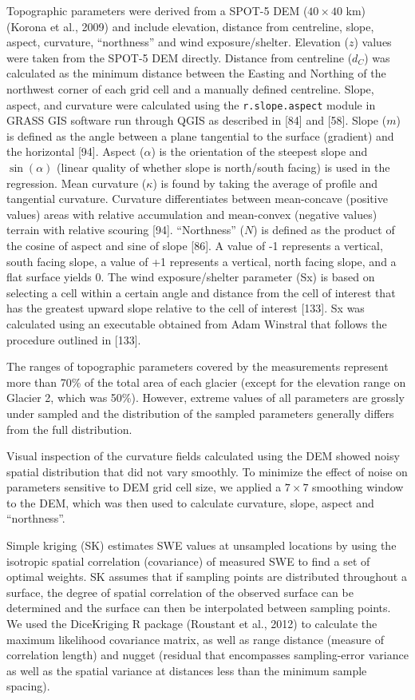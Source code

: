 \documentclass[twocolumn,letterpaper]{igs}
\begin{document}
Topographic parameters were derived from a SPOT-5 DEM ($40\times40$ km) (Korona et al., 2009) and include elevation, distance from centreline, slope, aspect, curvature, ``northness'' and wind exposure/shelter. Elevation ($z$) values were taken from the SPOT-5 DEM directly. Distance from centreline ($d_C$) was calculated as the minimum distance between the Easting and Northing of the northwest corner of each grid cell and a manually defined centreline. Slope, aspect, and curvature were calculated using the \texttt{r.slope.aspect} module in GRASS GIS software run through QGIS as described in [84] and [58]. Slope ($m$) is defined as the angle between a plane tangential to the surface (gradient) and the horizontal [94]. Aspect ($\alpha$) is the orientation of the steepest slope and $\sin(\alpha)$ (linear quality of whether slope is north/south facing) is used in the regression. Mean curvature ($\kappa$) is found by taking the average of profile and tangential curvature. Curvature differentiates between mean-concave (positive values) areas with relative accumulation and mean-convex (negative values) terrain with relative scouring [94].   ``Northness'' ($N$) is defined as the product of the cosine of aspect and sine of slope [86]. A value of -1 represents a vertical, south facing slope, a value of +1 represents a vertical, north facing slope, and a flat surface yields 0. The wind exposure/shelter parameter (Sx) is based on selecting a cell within a certain angle and distance from the cell of interest that has the greatest upward slope relative to the cell of interest [133]. Sx was calculated using an executable obtained from Adam Winstral that follows the procedure outlined in [133]. 

The ranges of topographic parameters covered by the measurements represent more than 70\% of the total area of each glacier (except for the elevation range on Glacier 2, which was 50\%). However, extreme values of all parameters are grossly under sampled and the
distribution of the sampled parameters generally differs from the full distribution.

Visual inspection of the curvature fields calculated using the DEM showed noisy spatial
distribution that did not vary smoothly. To minimize the effect of noise on parameters sensitive to DEM grid cell size, we applied a $7\times7$ smoothing window to the DEM, which was then used to calculate curvature, slope, aspect and ``northness''.

Simple kriging (SK) estimates SWE values at unsampled locations by using the isotropic spatial correlation (covariance) of measured SWE to find a set of optimal weights. SK assumes that if sampling points are distributed throughout a surface, the degree of spatial correlation of the observed surface can be determined and the surface can then be interpolated between sampling points. We used the DiceKriging R package (Roustant et al., 2012) to calculate the maximum likelihood covariance matrix, as well as range distance (measure of correlation length) and nugget (residual that encompasses sampling-error variance as well as the spatial variance at distances less than the minimum sample spacing). 
\end{document}
